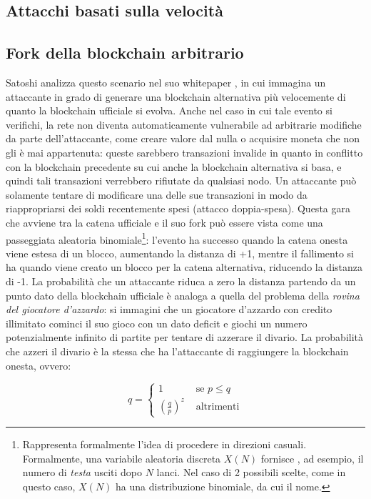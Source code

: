 \subsection{Attacchi basati sulla velocità}

\subsection{Fork della blockchain arbitrario}\label{double-spending}

Satoshi analizza questo scenario nel suo whitepaper \cite{bitcoin}, in cui immagina un attaccante in grado di generare una blockchain alternativa più velocemente di quanto la blockchain ufficiale si evolva.
Anche nel caso in cui tale evento si verifichi, la rete non diventa automaticamente vulnerabile ad arbitrarie modifiche da parte dell'attaccante, come creare valore dal nulla o acquisire moneta che non gli è mai appartenuta: queste sarebbero transazioni invalide in quanto in conflitto con la blockchain precedente su cui anche la blockchain alternativa si basa, e quindi tali transazioni verrebbero rifiutate da qualsiasi nodo. Un attaccante può solamente tentare di modificare una delle sue transazioni in modo da riappropriarsi dei soldi recentemente spesi (attacco doppia-spesa).
Questa gara che avviene tra la catena ufficiale e il suo fork può essere vista come una passeggiata aleatoria binomiale\footnote{Rappresenta formalmente l'idea di procedere in direzioni casuali. Formalmente, una variabile aleatoria discreta $X(N)$ fornisce , ad esempio, il numero di \emph{testa} usciti dopo $N$ lanci. Nel caso di 2 possibili scelte, come in questo caso, $X(N)$ ha una distribuzione binomiale, da cui il nome.}: l'evento ha successo quando la catena onesta viene estesa di un blocco, aumentando la distanza di +1, mentre il fallimento si ha quando viene creato un blocco per la catena alternativa, riducendo la distanza di -1.
La probabilità che un attaccante riduca a zero la distanza partendo da un punto dato della blockchain ufficiale è analoga a quella del problema della \emph{rovina del giocatore d'azzardo}: si immagini che un giocatore d'azzardo con credito illimitato cominci il suo gioco con un dato deficit e giochi un numero potenzialmente infinito di partite per tentare di azzerare il divario.
La probabilità che azzeri il divario è la stessa che ha l'attaccante di raggiungere la blockchain onesta, ovvero:

\[
q = \begin{cases}
1 & \text{ se } p \leq q \\
\left( \frac{q}{p} \right)^z & \text{ altrimenti}
\end{cases}
\]

